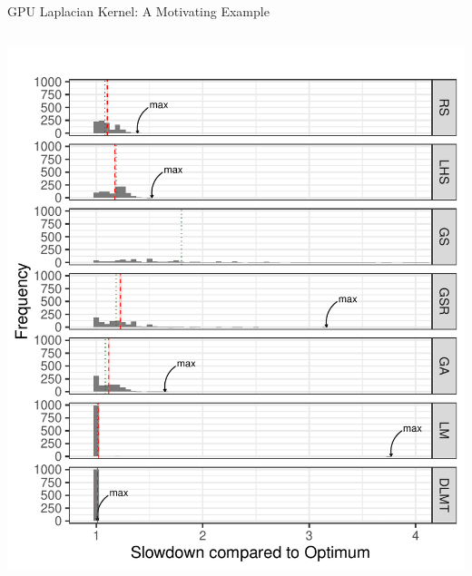 \documentclass[10pt, compress, aspectratio=169, xcolor={table,usenames,dvipsnames}]{beamer}
\begin{document}
\begin{frame}[label={sec:orgba4181b}]{GPU Laplacian Kernel: A Motivating Example}
\begin{columns}
\begin{column}{0.5\columnwidth}
\begin{center}
\begin{center}
\includegraphics[width=.88\columnwidth]{../img/comparison_histogram.pdf}
\end{center}
\end{center}
\end{column}
\end{columns}
\end{frame}
\end{document}
